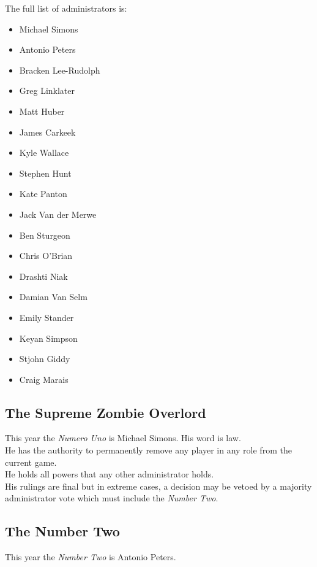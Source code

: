 \documentclass[a4paper,12pt]{article}
\newcommand{\theMainGuy}{Michael Simons}
\newcommand{\theOtherGuy}{Antonio Peters}
\begin{document}
The full list of administrators is:
\label{Admins}
\begin{itemize}
    \item {Michael Simons}
    \item {Antonio Peters}
    \item {Bracken Lee-Rudolph}
    \item {Greg Linklater}
    \item {Matt Huber}
    \item {James Carkeek}  
    \item {Kyle Wallace}
    \item {Stephen Hunt}
    \item {Kate Panton }
    \item {Jack Van der Merwe}
    \item {Ben Sturgeon}
    \item {Chris O'Brian}
    \item {Drashti Niak}
    \item {Damian Van Selm}
    \item {Emily Stander}
    \item {Keyan Simpson}
    \item {Stjohn Giddy}
    \item {Craig Marais}    
    
\end{itemize}

\subsection{The Supreme Zombie Overlord}

This year the \emph{Numero Uno} is \theMainGuy. His word is law.\\

He has the authority to permanently remove any player in any role from the current game.\\

He holds all powers that any other administrator holds.\\

His rulings are final but in extreme cases, a decision may be vetoed by a majority administrator vote which must include the \emph{Number Two}.

\subsection{The Number Two}

This year the \emph{Number Two} is \theOtherGuy.
\end{document}
